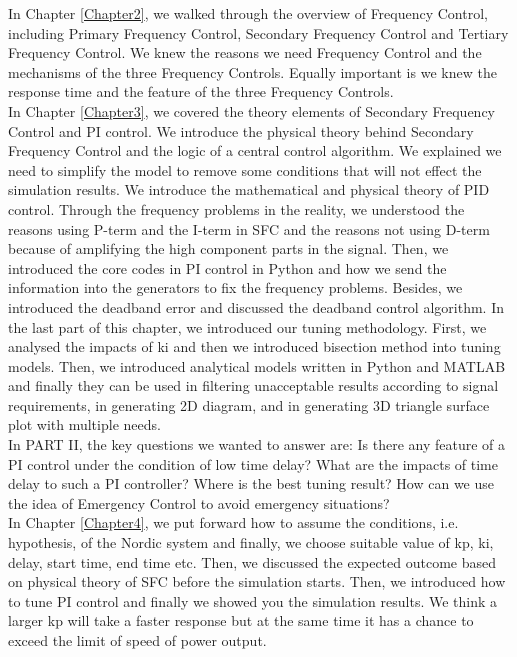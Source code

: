 \documentclass{report}
\begin{document}
In Chapter \textcolor{red}{\ref{Chapter2}}, we walked through the overview of Frequency Control, including Primary Frequency Control, Secondary Frequency Control and Tertiary Frequency Control. We knew the reasons we need Frequency Control and the mechanisms of the three Frequency Controls. Equally important is we knew the response time and the feature of the three Frequency Controls.\\

In Chapter \textcolor{red}{\ref{Chapter3}}, we covered the theory elements of Secondary Frequency Control and PI control. We introduce the physical theory behind Secondary Frequency Control and the logic of a central control algorithm. We explained we need to simplify the model to remove some conditions that will not effect the simulation results. We introduce the mathematical and physical theory of PID control. Through the frequency problems in the reality, we understood the reasons using P-term and the I-term in SFC and the reasons not using D-term because of amplifying the high component parts in the signal. Then, we introduced the core codes in PI control in Python and how we send the information into the generators to fix the frequency problems. Besides, we introduced the deadband error and discussed the deadband control algorithm. In the last part of this chapter, we introduced our tuning methodology. First, we analysed the impacts of ki and then we introduced bisection method into tuning models. Then, we introduced analytical models written in Python and MATLAB and finally they can be used in filtering unacceptable results according to signal requirements, in generating 2D diagram, and in generating 3D triangle surface plot with multiple needs.\\

In PART II, the key questions we wanted to answer are: Is there any feature of a PI control under the condition of low time delay? What are the impacts of time delay to such a PI controller? Where is the best tuning result? How can we use the idea of Emergency Control to avoid emergency situations?\\

In Chapter \textcolor{red}{\ref{Chapter4}}, we put forward how to assume the conditions, i.e. hypothesis, of the Nordic system and finally, we choose suitable value of kp, ki, delay, start time, end time etc. Then, we discussed the expected outcome based on physical theory of SFC before the simulation starts. Then, we introduced how to tune PI control and finally we showed you the simulation results. We think a larger kp will take a faster response but at the same time it has a chance to exceed the limit of speed of power output.\\
\end{document}
